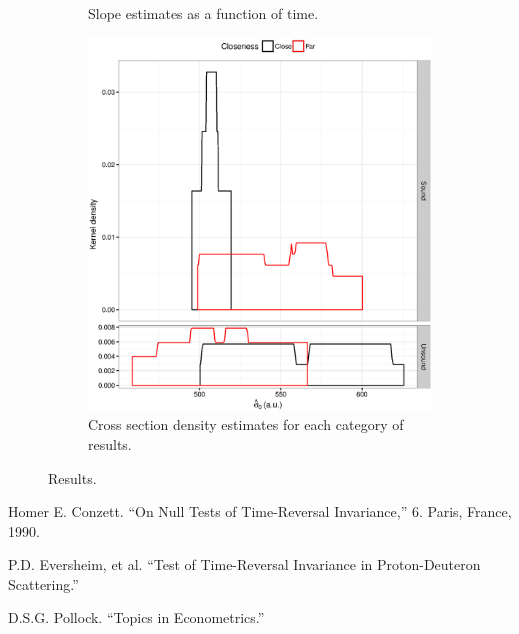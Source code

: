 \documentclass[reprint]{revtex4-1}
\newcommand{\scl}{.4}
\begin{document}
\begin{figure}
\begin{subfigure}{.5\textwidth}
\caption{Slope estimates as a function of time.\label{fig:Slopes}}
\end{subfigure}
\begin{subfigure}{.5\textwidth}
\includegraphics[scale=\scl]{img/Cross-Section2012_dens.eps}
\caption{Cross section density estimates for each category of results.\label{fig:CS-dens}}
\end{subfigure}
\caption{Results.}
\end{figure}


\begin{thebibliography}{9}
Homer E. Conzett. ``On Null Tests of Time-Reversal Invariance,'' 6. Paris, France, 1990. %

P.D. Eversheim, et al. ``Test of Time-Reversal Invariance in Proton-Deuteron Scattering.''

D.S.G. Pollock. ``Topics in Econometrics.'' %

\end{thebibliography}
\end{document}
